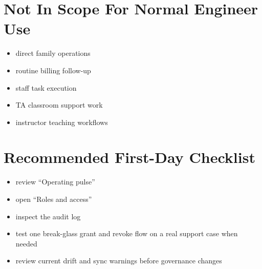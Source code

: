 \documentclass[11pt]{article}
\begin{document}
\section*{Not In Scope For Normal Engineer Use}
\begin{itemize}
  \item direct family operations
  \item routine billing follow-up
  \item staff task execution
  \item TA classroom support work
  \item instructor teaching workflows
\end{itemize}

\section*{Recommended First-Day Checklist}
\begin{itemize}
  \item review ``Operating pulse''
  \item open ``Roles and access''
  \item inspect the audit log
  \item test one break-glass grant and revoke flow on a real support case when needed
  \item review current drift and sync warnings before governance changes
\end{itemize}
\end{document}
